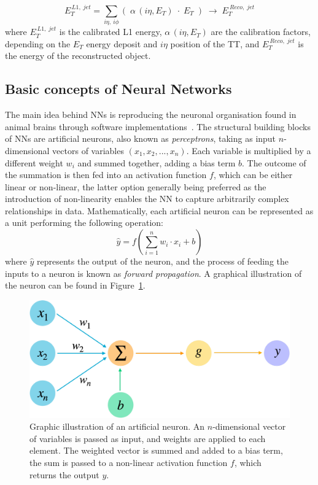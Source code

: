 \begin{equation}
    E_T^{\,L1,\;jet} = \sum_{i\eta,\:i\phi}\left(\;\alpha\,(i\eta,E_{T})\;\cdot\;E_{T}\;\right) 
    \;\longrightarrow\;
    E_T^{\:Reco,\;jet}
\end{equation}
where $E_T^{\,L1,\;jet}$ is the calibrated L1 energy, $\alpha\,(i\eta,E_{T})$ are the calibration factors, depending on the $E_T$ energy deposit and $i\eta$ position of the TT, and $E_T^{\:Reco,\;jet}$ is the energy of the reconstructed object.

\subsection{Basic concepts of Neural Networks}

The main idea behind NNs is reproducing the neuronal organisation found in animal brains through software implementations~\cite{1672070}.
The structural building blocks of NNs are artificial neurons, also known as \textit{perceptrons}, taking as input $n$-dimensional vectors of variables $(x_1,x_2,...,x_n)$. Each variable is multiplied by a different weight $w_i$ and summed together, adding a bias term $b$.
The outcome of the summation is then fed into an activation function $f$, which can be either linear or non-linear, the latter option generally being preferred as the introduction of non-linearity enables the NN to capture arbitrarily complex relationships in data.
Mathematically, each artificial neuron can be represented as a unit performing the following operation:
\begin{equation}
    \hat{y}=f\left( \sum_{i=1}^{n}w_i \cdot x_i + b \right)
\end{equation}
where $\hat{y}$ represents the output of the neuron, and the process of feeding the inputs to a neuron is known as \textit{forward propagation}. A graphical illustration of the neuron can be found in Figure~\ref{fig:Perceptron}.

\begin{figure}
    \centering
    \includegraphics[width=0.6\linewidth]{Figures/L1TP/Perceptron.pdf}
    \caption{Graphic illustration of an artificial neuron. An $n$-dimensional vector of variables is passed as input, and weights are applied to each element. The weighted vector is summed and added to a bias term, the sum is passed to a non-linear activation function $f$, which returns the output $y$.}
    \label{fig:Perceptron}
\end{figure}

